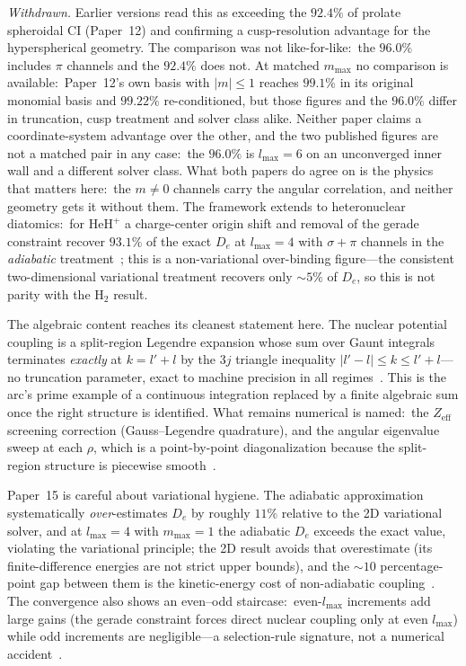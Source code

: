 \documentclass[aps,pra,twocolumn,superscriptaddress,longbibliography]{revtex4-2}
\begin{document}
\emph{Withdrawn.}  Earlier versions read this as exceeding the
$92.4\%$ of prolate spheroidal CI (Paper~12) and confirming a
cusp-resolution advantage for the hyperspherical geometry.  The
comparison was not like-for-like:\ the $96.0\%$ includes $\pi$
channels and the $92.4\%$ does not.  At matched $m_{\max}$ no comparison is
available:\ Paper~12's own basis with $|m| \le 1$ reaches $99.1\%$ in its
original monomial basis and $99.22\%$ re-conditioned,
but those figures and the $96.0\%$ differ in truncation, cusp treatment and
solver class alike.  Neither paper claims a coordinate-system advantage
over the other, and the two published figures are not a matched pair in
any case:\ the $96.0\%$ is $l_{\max} = 6$ on an unconverged inner
wall and a different solver class.  What both papers do agree on
is the physics that matters here:\ the $m \ne 0$ channels carry the
angular correlation, and neither geometry gets it without them.  The framework extends to heteronuclear
diatomics:\ for $\mathrm{HeH}^+$ a charge-center origin shift and
removal of the gerade constraint recover $93.1\%$ of the exact $D_e$ at
$l_{\max}=4$ with $\sigma+\pi$ channels in the \emph{adiabatic}
treatment~\cite{loutey_paper15}; this is a non-variational over-binding
figure---the consistent two-dimensional variational treatment recovers
only $\sim\!5\%$ of $D_e$, so this is not parity with the
$\mathrm{H}_2$ result.

The algebraic content reaches its cleanest statement here.  The nuclear
potential coupling is a split-region Legendre expansion whose sum over
Gaunt integrals terminates \emph{exactly} at $k = l' + l$ by the $3j$
triangle inequality $|l' - l| \le k \le l' + l$---no truncation
parameter, exact to machine precision in all
regimes~\cite{loutey_paper15}.  This is the arc's prime example of a
continuous integration replaced by a finite algebraic sum once the
right structure is identified.  What remains numerical is named:\ the
$Z_{\mathrm{eff}}$ screening correction (Gauss--Legendre quadrature),
and the angular eigenvalue sweep at each $\rho$, which is a
point-by-point diagonalization because the split-region structure is
piecewise smooth~\cite{loutey_paper15, loutey_paper18}.

Paper~15 is careful about variational hygiene.  The adiabatic
approximation systematically \emph{over}-estimates $D_e$ by roughly
$11\%$ relative to the 2D variational solver, and at $l_{\max}=4$ with
$m_{\max}=1$ the adiabatic $D_e$ exceeds the exact value, violating the
variational principle; the 2D result avoids that overestimate (its
finite-difference energies are not strict upper bounds), and the
$\sim\!10$ percentage-point gap between them is the kinetic-energy cost
of non-adiabatic coupling~\cite{loutey_paper15}.  The convergence also
shows an even--odd staircase:\ even-$l_{\max}$ increments add large
gains (the gerade constraint forces direct nuclear coupling only at even
$l_{\max}$) while odd increments are negligible---a selection-rule
signature, not a numerical accident~\cite{loutey_paper15}.
\end{document}
